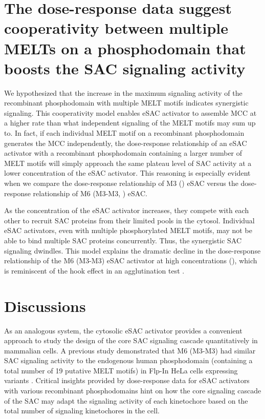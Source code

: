 \section{The dose-response data suggest cooperativity between multiple MELTs on a  phosphodomain that boosts the SAC signaling activity}
\label{ProzoneEffectModel}
We hypothesized that the increase in the maximum signaling activity of the recombinant  phosphodomain with multiple MELT motifs indicates synergistic signaling. This cooperativity model enables eSAC activator to assemble MCC at a higher rate than what independent signaling of the MELT motifs may sum up to. In fact, if each individual MELT motif on a recombinant  phosphodomain generates the MCC independently, the dose-response relationship of an eSAC activator with a recombinant phosphodomain containing a larger number of MELT motifs will simply approach the same plateau level of SAC activity at a lower concentration of the eSAC activator. This reasoning is especially evident when we compare the dose-response relationship of M3 () eSAC versus the dose-response relationship of M6 (M3-M3, ) eSAC.

As the concentration of the eSAC activator increases, they compete with each other to recruit SAC proteins from their limited pools in the cytosol. Individual eSAC activators, even with multiple phosphorylated MELT motifs, may not be able to bind multiple SAC proteins concurrently. Thus, the synergistic SAC signaling dwindles. This model explains the dramatic decline in the dose-response relationship of the M6 (M3-M3) eSAC activator at high concentrations (), which is reminiscent of the hook effect in an agglutination test \cite{HenryV24}. %

\section{Discussions}
\label{eSACDiscussions}
As an analogous system, the cytosolic eSAC activator provides a convenient approach to study the design of the core SAC signaling cascade quantitatively in mammalian cells. A previous study demonstrated that M6 (M3-M3) had similar SAC signaling activity to the endogenous human  phosphodomain (containing a total number of 19 putative MELT motifs) in Flp-In\texttrademark{} HeLa cells expressing  variants \cite{RecombinantKNL1}. Critical insights provided by dose-response data for eSAC activators with various recombinant phosphodomains hint on how the core signaling cascade of the SAC may adapt the signaling activity of each kinetochore based on the total number of signaling kinetochores in the cell.

